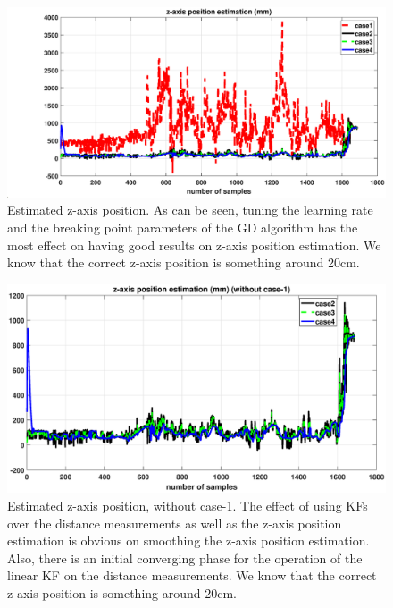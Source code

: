 \documentclass{article}
\begin{document}
\begin{figure}[thpb]
\centering
\includegraphics[scale=0.4]{Pics/Fig_logged/pos_z.eps}
\caption{Estimated z-axis position. As can be seen, tuning the learning rate and the breaking point parameters of the GD algorithm has the most effect on having good results on z-axis position estimation. We know that the correct z-axis position is something around 20cm.}
\label{Fig_logged_03}
\end{figure}

\begin{figure}[thpb]
\centering
\includegraphics[scale=0.4]{Pics/Fig_logged/pos_z1.eps}
\caption{Estimated z-axis position, without case-1. The effect of using KFs over the distance measurements as well as the z-axis position estimation is obvious on smoothing the z-axis position estimation. Also, there is an initial converging phase for the operation of the linear KF on the distance measurements. We know that the correct z-axis position is something around 20cm.}
\label{Fig_logged_04}
\end{figure}
\end{document}
